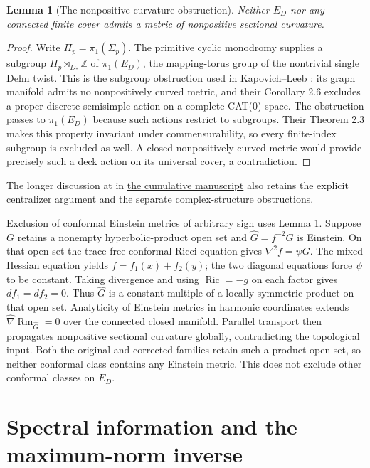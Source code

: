 \documentclass[a4paper,11pt]{article}
\numberwithin{equation}{section}
\newtheorem{lemma}[theorem]{Lemma}
\theoremstyle{definition}
\newcommand{\Ric}{\operatorname{Ric}}
\newcommand{\Rm}{\operatorname{Rm}}
\begin{document}
\begin{lemma}[The nonpositive-curvature obstruction]\label{lem:ED-no-npc}
Neither $E_D$ nor any connected finite cover admits a metric of nonpositive sectional curvature.
\end{lemma}
\begin{proof}
Write $\Pi_p=\pi_1(\Sigma_p)$. The primitive cyclic monodromy supplies a subgroup
$\Pi_p\rtimes_{D_*}\mathbb Z$ of $\pi_1(E_D)$, the mapping-torus group of the nontrivial single Dehn twist.
This is the subgroup obstruction used in Kapovich--Leeb \cite[Theorem 4.5]{KapovichLeeb}: its graph manifold admits no nonpositively curved metric, and their Corollary 2.6 excludes a proper discrete semisimple action on a complete CAT(0) space.
The obstruction passes to $\pi_1(E_D)$ because such actions restrict to subgroups.
Their Theorem 2.3 makes this property invariant under commensurability, so every finite-index subgroup is excluded as well.
A closed nonpositively curved metric would provide precisely such a deck action on its universal cover, a contradiction.
\end{proof}
The longer discussion at  in \href{20260912.tex}{the cumulative manuscript} also retains the explicit centralizer argument and the separate complex-structure obstructions.

Exclusion of conformal Einstein metrics of arbitrary sign uses Lemma \ref{lem:ED-no-npc}.
Suppose $G$ retains a nonempty hyperbolic-product open set and $\widehat G=f^{-2}G$ is Einstein.
On that open set the trace-free conformal Ricci equation gives $\nabla^2f=\psi G$.
The mixed Hessian equation yields $f=f_1(x)+f_2(y)$; the two diagonal equations force $\psi$ to be constant.
Taking divergence and using $\Ric=-g$ on each factor gives $df_1=df_2=0$.
Thus $\widehat G$ is a constant multiple of a locally symmetric product on that open set.
Analyticity of Einstein metrics in harmonic coordinates \cite[Theorem 5.2]{DeTurckKazdan}
extends $\widehat\nabla\Rm_{\widehat G}=0$ over the connected closed manifold.
Parallel transport then propagates nonpositive sectional curvature globally, contradicting the topological input.
Both the original and corrected families retain such a product open set, so neither conformal class contains any Einstein metric.
This does not exclude other conformal classes on $E_D$.

\section{Spectral information and the maximum-norm inverse}\label{sec:ED-inverse}
\end{document}
